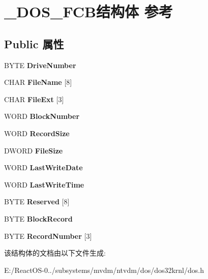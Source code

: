 \hypertarget{struct___d_o_s___f_c_b}{}\section{\+\_\+\+D\+O\+S\+\_\+\+F\+C\+B结构体 参考}
\label{struct___d_o_s___f_c_b}
\subsection*{Public 属性}
\begin{DoxyCompactItemize}
\item 
\mbox{\label{struct___d_o_s___f_c_b_a8d1126b76954186872055f8dca14273c}} 
B\+Y\+TE {\bfseries Drive\+Number}
\item 
\mbox{\label{struct___d_o_s___f_c_b_af452c3e3e4b88cad2a2cd5b82ec1e2ff}} 
C\+H\+AR {\bfseries File\+Name} \mbox{[}8\mbox{]}
\item 
\mbox{\label{struct___d_o_s___f_c_b_a3c1a21055e5b5428f38577400e70fbe8}} 
C\+H\+AR {\bfseries File\+Ext} \mbox{[}3\mbox{]}
\item 
\mbox{\label{struct___d_o_s___f_c_b_a117876839e1869b540882282b808aa1a}} 
W\+O\+RD {\bfseries Block\+Number}
\item 
\mbox{\label{struct___d_o_s___f_c_b_aef0db21daf454b310bf4f43931294bda}} 
W\+O\+RD {\bfseries Record\+Size}
\item 
\mbox{\label{struct___d_o_s___f_c_b_a76f2e47cc688b4ebccda1066382011e8}} 
D\+W\+O\+RD {\bfseries File\+Size}
\item 
\mbox{\label{struct___d_o_s___f_c_b_a272d9e746d1359252a84cf68ff431219}} 
W\+O\+RD {\bfseries Last\+Write\+Date}
\item 
\mbox{\label{struct___d_o_s___f_c_b_a8732370b274d95b4c9cb51eeeb56ff2c}} 
W\+O\+RD {\bfseries Last\+Write\+Time}
\item 
\mbox{\label{struct___d_o_s___f_c_b_af72497eeb7f65c26d2d06b09cb816242}} 
B\+Y\+TE {\bfseries Reserved} \mbox{[}8\mbox{]}
\item 
\mbox{\label{struct___d_o_s___f_c_b_a38d773f9bfcdd440acc569bba776a854}} 
B\+Y\+TE {\bfseries Block\+Record}
\item 
\mbox{\label{struct___d_o_s___f_c_b_af3990897557ede0fa8642dd603d4f9e0}} 
B\+Y\+TE {\bfseries Record\+Number} \mbox{[}3\mbox{]}
\end{DoxyCompactItemize}


该结构体的文档由以下文件生成\+:\begin{DoxyCompactItemize}
\item 
E\+:/\+React\+O\+S-\/0../subsystems/mvdm/ntvdm/dos/dos32krnl/dos.\+h\end{DoxyCompactItemize}
